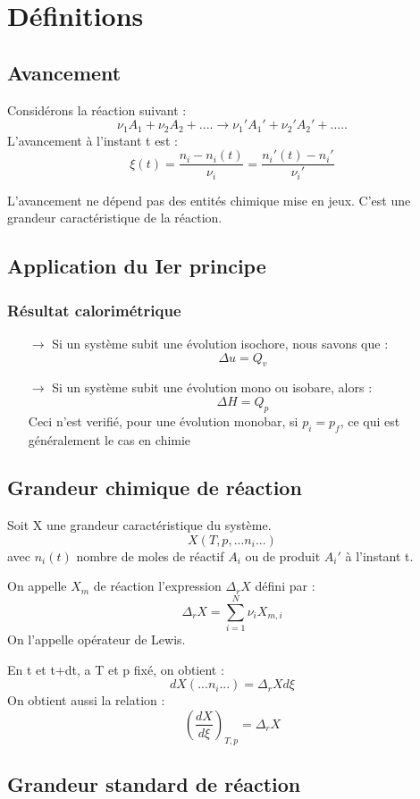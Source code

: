 \chapter{Définitions}
\section{Avancement}
\begin{de}
 Considérons la réaction suivant :
$$\nu_1A_1 + \nu_2A_2 + .... \rightarrow \nu_1'A_1' + \nu_2'A_2' + .....$$
L'avancement à l'instant t est :
$$\xi(t) = \dfrac{n_i - n_i(t)}{\nu_i} = \dfrac{n_i'(t) - n_i'}{\nu_i'} $$
\end{de}
L'avancement ne dépend pas des entités chimique mise en jeux. C'est une grandeur caractéristique de la réaction.
\section{Application du Ier principe}
\subsection{Résultat calorimétrique}
\begin{itemize}
 \item[$\rightarrow$] Si un système subit une évolution isochore, nous savons que : $$\Delta u = Q_v$$
 \item[$\rightarrow$] Si un système subit une évolution mono ou isobare, alors :
$$\Delta H = Q_p$$ Ceci n'est verifié, pour une évolution monobar, si $p_i = p_f$, ce qui est généralement le cas en chimie
\end{itemize}
\section{Grandeur chimique de réaction}
Soit X une grandeur caractéristique du système. $$X(T,p,...n_i...)$$ avec $n_i(t)$ nombre de moles de réactif $A_i$ ou de produit $A_i'$ à l'instant t.\
\begin{de}
On appelle $X_m$ de réaction l'expression $\Delta_r X$ défini par :
$$\Delta_r X = \sum_{i=1}^N \nu_i X_{m,i}$$
On l'appelle opérateur de Lewis.
\end{de}
En t et t+dt, a T et p fixé, on obtient : 
$$dX(...n_i...) = \Delta_r X d\xi$$
On obtient aussi la relation :
$$\left(\dfrac{dX}{d\xi}\right)_{T,p}=\Delta_r X$$
\section{Grandeur standard de réaction}
